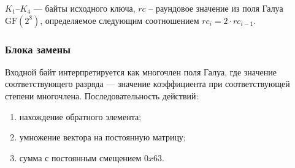 $K_1$--$K_4$ --- байты исходного ключа, $rc$ -- раундовое значение из
поля Галуа $\mathrm{GF}(2^8)$, определяемое следующим соотношением
$rc_i = 2 \cdot rc_{i - 1}$.

\subsubsection{Блока замены}

Входной байт интерпретируется как многочлен поля Галуа, где значение
соответствующего разряда --- значение коэффициента при соответствующей
степени многочлена. Последовательность действий:
\begin{enumerate}
    \item нахождение обратного элемента;
    \item умножение вектора на постоянную матрицу;
    \item сумма с постоянным смещением $0x63$.
\end{enumerate}


